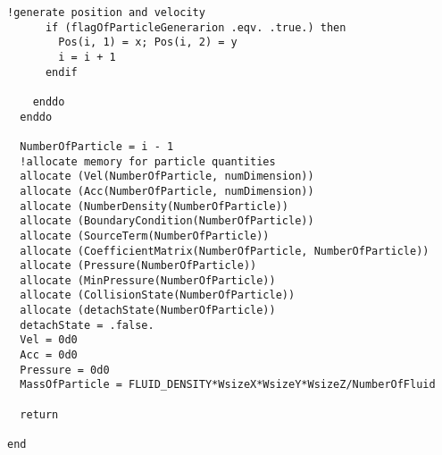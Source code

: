 \begin{lstlisting}[caption=粒子初期化ルーチン]
      !generate position and velocity
      if (flagOfParticleGenerarion .eqv. .true.) then
        Pos(i, 1) = x; Pos(i, 2) = y
        i = i + 1
      endif

    enddo
  enddo

  NumberOfParticle = i - 1
  !allocate memory for particle quantities
  allocate (Vel(NumberOfParticle, numDimension))
  allocate (Acc(NumberOfParticle, numDimension))
  allocate (NumberDensity(NumberOfParticle))
  allocate (BoundaryCondition(NumberOfParticle))
  allocate (SourceTerm(NumberOfParticle))
  allocate (CoefficientMatrix(NumberOfParticle, NumberOfParticle))
  allocate (Pressure(NumberOfParticle))
  allocate (MinPressure(NumberOfParticle))
  allocate (CollisionState(NumberOfParticle))
  allocate (detachState(NumberOfParticle))
  detachState = .false.
  Vel = 0d0
  Acc = 0d0
  Pressure = 0d0
  MassOfParticle = FLUID_DENSITY*WsizeX*WsizeY*WsizeZ/NumberOfFluid

  return

end
\end{lstlisting}